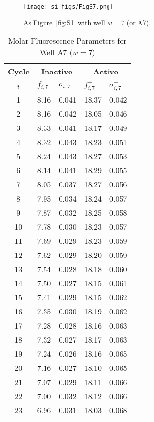                 \begin{figure}
                    \centering
                    \texttt{[image: si-figs/FigS7.png]}
                    \caption{
                        As Figure~\ref{fig:S1} with well $w=7$ (or A7).
                    }
                \end{figure}
                \clearpage
    \begin{table}
        \caption{Molar Fluorescence Parameters for Well A7 ($w=7$)}
        \centering
        \begin{tabular}{c|ll|ll}
            Cycle & \multicolumn{2}{c|}{Inactive} & \multicolumn{2}{c}{Active} \\
            \hline
            $i$ & $f_{i,7}^{-}$ & $\sigma_{i,7}^{-}$ &  $f_{i,7}^{+}$ & $\sigma_{i,7}^{+}$ \\
            \hline
    1 & 8.16 & 0.041 & 18.37 & 0.042 \\
2 & 8.16 & 0.042 & 18.05 & 0.046 \\
3 & 8.33 & 0.041 & 18.17 & 0.049 \\
4 & 8.32 & 0.043 & 18.23 & 0.051 \\
5 & 8.24 & 0.043 & 18.27 & 0.053 \\
6 & 8.14 & 0.041 & 18.29 & 0.055 \\
7 & 8.05 & 0.037 & 18.27 & 0.056 \\
8 & 7.95 & 0.034 & 18.24 & 0.057 \\
9 & 7.87 & 0.032 & 18.25 & 0.058 \\
10 & 7.78 & 0.030 & 18.23 & 0.057 \\
11 & 7.69 & 0.029 & 18.23 & 0.059 \\
12 & 7.62 & 0.029 & 18.20 & 0.059 \\
13 & 7.54 & 0.028 & 18.18 & 0.060 \\
14 & 7.50 & 0.027 & 18.15 & 0.061 \\
15 & 7.41 & 0.029 & 18.15 & 0.062 \\
16 & 7.35 & 0.030 & 18.19 & 0.062 \\
17 & 7.28 & 0.028 & 18.16 & 0.063 \\
18 & 7.32 & 0.027 & 18.17 & 0.063 \\
19 & 7.24 & 0.026 & 18.16 & 0.065 \\
20 & 7.16 & 0.027 & 18.10 & 0.065 \\
21 & 7.07 & 0.029 & 18.11 & 0.066 \\
22 & 7.00 & 0.032 & 18.12 & 0.066 \\
23 & 6.96 & 0.031 & 18.03 & 0.068 \\

\end{tabular}
\end{table}
